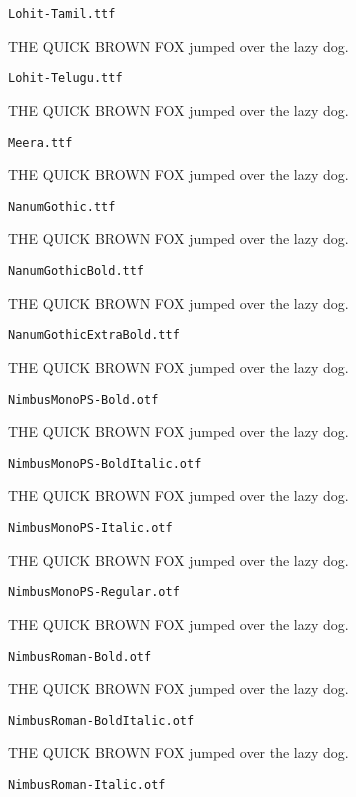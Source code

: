 \documentclass{article}
\begin{document}
\setmainfont[Extension=.ttf]{Lohit-Tamil}
\noindent \verb!Lohit-Tamil.ttf!

THE QUICK BROWN FOX jumped over the lazy dog.

\setmainfont[Extension=.ttf]{Lohit-Telugu}
\noindent \verb!Lohit-Telugu.ttf!

THE QUICK BROWN FOX jumped over the lazy dog.

\setmainfont[Extension=.ttf]{Meera}
\noindent \verb!Meera.ttf!

THE QUICK BROWN FOX jumped over the lazy dog.

\setmainfont[Extension=.ttf]{NanumGothic}
\noindent \verb!NanumGothic.ttf!

THE QUICK BROWN FOX jumped over the lazy dog.

\setmainfont[Extension=.ttf]{NanumGothicBold}
\noindent \verb!NanumGothicBold.ttf!

THE QUICK BROWN FOX jumped over the lazy dog.

\setmainfont[Extension=.ttf]{NanumGothicExtraBold}
\noindent \verb!NanumGothicExtraBold.ttf!

THE QUICK BROWN FOX jumped over the lazy dog.

\setmainfont[Extension=.otf]{NimbusMonoPS-Bold}
\noindent \verb!NimbusMonoPS-Bold.otf!

THE QUICK BROWN FOX jumped over the lazy dog.

\setmainfont[Extension=.otf]{NimbusMonoPS-BoldItalic}
\noindent \verb!NimbusMonoPS-BoldItalic.otf!

THE QUICK BROWN FOX jumped over the lazy dog.

\setmainfont[Extension=.otf]{NimbusMonoPS-Italic}
\noindent \verb!NimbusMonoPS-Italic.otf!

THE QUICK BROWN FOX jumped over the lazy dog.

\setmainfont[Extension=.otf]{NimbusMonoPS-Regular}
\noindent \verb!NimbusMonoPS-Regular.otf!

THE QUICK BROWN FOX jumped over the lazy dog.

\setmainfont[Extension=.otf]{NimbusRoman-Bold}
\noindent \verb!NimbusRoman-Bold.otf!

THE QUICK BROWN FOX jumped over the lazy dog.

\setmainfont[Extension=.otf]{NimbusRoman-BoldItalic}
\noindent \verb!NimbusRoman-BoldItalic.otf!

THE QUICK BROWN FOX jumped over the lazy dog.

\setmainfont[Extension=.otf]{NimbusRoman-Italic}
\noindent \verb!NimbusRoman-Italic.otf!
\end{document}

